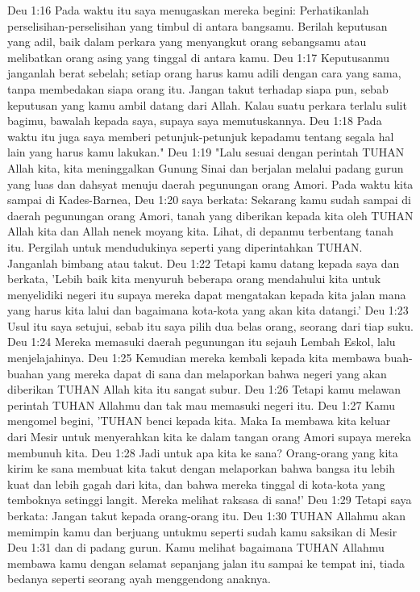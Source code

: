 Deu 1:16  Pada waktu itu saya menugaskan mereka begini: Perhatikanlah perselisihan-perselisihan yang timbul di antara bangsamu. Berilah keputusan yang adil, baik dalam perkara yang menyangkut orang sebangsamu atau melibatkan orang asing yang tinggal di antara kamu.
Deu 1:17  Keputusanmu janganlah berat sebelah; setiap orang harus kamu adili dengan cara yang sama, tanpa membedakan siapa orang itu. Jangan takut terhadap siapa pun, sebab keputusan yang kamu ambil datang dari Allah. Kalau suatu perkara terlalu sulit bagimu, bawalah kepada saya, supaya saya memutuskannya.
Deu 1:18  Pada waktu itu juga saya memberi petunjuk-petunjuk kepadamu tentang segala hal lain yang harus kamu lakukan."
Deu 1:19  "Lalu sesuai dengan perintah TUHAN Allah kita, kita meninggalkan Gunung Sinai dan berjalan melalui padang gurun yang luas dan dahsyat menuju daerah pegunungan orang Amori. Pada waktu kita sampai di Kades-Barnea,
Deu 1:20  saya berkata: Sekarang kamu sudah sampai di daerah pegunungan orang Amori, tanah yang diberikan kepada kita oleh TUHAN Allah kita dan Allah nenek moyang kita. Lihat, di depanmu terbentang tanah itu. Pergilah untuk mendudukinya seperti yang diperintahkan TUHAN. Janganlah bimbang atau takut.
Deu 1:22  Tetapi kamu datang kepada saya dan berkata, 'Lebih baik kita menyuruh beberapa orang mendahului kita untuk menyelidiki negeri itu supaya mereka dapat mengatakan kepada kita jalan mana yang harus kita lalui dan bagaimana kota-kota yang akan kita datangi.'
Deu 1:23  Usul itu saya setujui, sebab itu saya pilih dua belas orang, seorang dari tiap suku.
Deu 1:24  Mereka memasuki daerah pegunungan itu sejauh Lembah Eskol, lalu menjelajahinya.
Deu 1:25  Kemudian mereka kembali kepada kita membawa buah-buahan yang mereka dapat di sana dan melaporkan bahwa negeri yang akan diberikan TUHAN Allah kita itu sangat subur.
Deu 1:26  Tetapi kamu melawan perintah TUHAN Allahmu dan tak mau memasuki negeri itu.
Deu 1:27  Kamu mengomel begini, 'TUHAN benci kepada kita. Maka Ia membawa kita keluar dari Mesir untuk menyerahkan kita ke dalam tangan orang Amori supaya mereka membunuh kita.
Deu 1:28  Jadi untuk apa kita ke sana? Orang-orang yang kita kirim ke sana membuat kita takut dengan melaporkan bahwa bangsa itu lebih kuat dan lebih gagah dari kita, dan bahwa mereka tinggal di kota-kota yang temboknya setinggi langit. Mereka melihat raksasa di sana!'
Deu 1:29  Tetapi saya berkata: Jangan takut kepada orang-orang itu.
Deu 1:30  TUHAN Allahmu akan memimpin kamu dan berjuang untukmu seperti sudah kamu saksikan di Mesir
Deu 1:31  dan di padang gurun. Kamu melihat bagaimana TUHAN Allahmu membawa kamu dengan selamat sepanjang jalan itu sampai ke tempat ini, tiada bedanya seperti seorang ayah menggendong anaknya.
